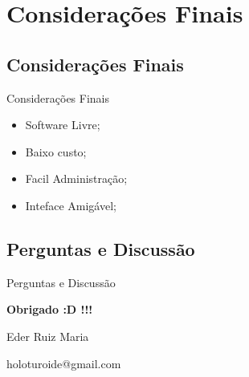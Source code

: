 \renewcommand{\titulo}{Considerações Finais}
\section{\titulo}

\renewcommand{\titulo}{Considerações Finais}
\subsection{\titulo}
\begin{frame}{\titulo}
\begin{itemize}
\item Software Livre;
\item Baixo custo;
\item Facil Administração;
\item Inteface Amigável;
\end{itemize}
\end{frame}

\renewcommand{\titulo}{Perguntas e Discussão}
\subsection{\titulo}
\begin{frame}{\titulo}
\begin{center}
\textbf{Obrigado :D !!!}

\vspace{1cm}
Eder Ruiz Maria

holoturoide@gmail.com
\end{center}
\end{frame}
